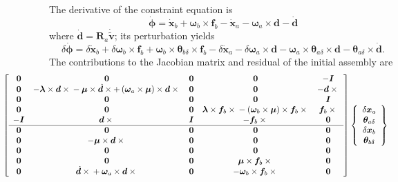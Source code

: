 \documentclass[10pt,fleqn,subeqn]{report}
\newcommand{\T}[1]{\bm{#1}}
\begin{document}
The derivative of the constraint equation is
\begin{equation}
	\dot{\T{\phi}} = 
		\dot{\T{x}}_b
		+ \T{\omega}_b \times \T{f}_b
		- \dot{\T{x}}_a
		- \T{\omega}_a \times \T{d}
		- \dot{\T{d}}
\end{equation}
where $\dot{\T{d}}=\T{R}_a\dot{\tilde{\T{v}}}$; its perturbation yields
\begin{equation}
	\delta\dot{\T{\phi}}
	= \delta\dot{\T{x}}_b
	+ \delta\T{\omega}_b \times \T{f}_b
	+ \T{\omega}_b \times \T{\theta}_{b\delta} \times \T{f}_b
	- \delta\dot{\T{x}}_a
	- \delta\T{\omega}_a \times \T{d}
	- \T{\omega}_a \times \T{\theta}_{a\delta} \times \T{d}
	- \T{\theta}_{a\delta} \times \dot{\T{d}} .
\end{equation}
The contributions to the Jacobian matrix and residual 
of the initial assembly are
\begin{align}
	\small
	& \hspace{-20mm}\sqbr{\matr{ccccc}{
		\T{0} & \T{0} & \T{0} & \T{0} & -\T{I} \\	%
		\T{0} & -\T{\lambda}\times\T{d}\times{}
			- \T{\mu}\times\dot{\T{d}}\times
			+ \plbr{\T{\omega}_a\times\T{\mu}}\times\T{d}\times{} &
			\T{0} & \T{0} & -\T{d}\times{} \\	%
		\T{0} & \T{0} & \T{0} & \T{0} & \T{I} \\	%
		\T{0} & \T{0} & \T{0} & 
			\T{\lambda}\times\T{f}_b\times{}
			- \plbr{\T{\omega}_b\times\T{\mu}}\times\T{f}_b\times{} &
			\T{f}_b\times{} \\	%
		-\T{I} & \T{d}\times{} & \T{I} & -\T{f}_b\times{} &
			\T{0} \\				%
%
	\hline
		\T{0} & \T{0} & \T{0} & \T{0} & \T{0} \\	%
		\T{0} & -\T{\mu}\times\T{d}\times{} &
			\T{0} & \T{0} & \T{0} \\		%
		\T{0} & \T{0} & \T{0} & \T{0} & \T{0} \\	%
		\T{0} & \T{0} & \T{0} &
			\T{\mu}\times\T{f}_b\times{} & \T{0} \\	%
		\T{0} &
			\dot{\T{d}}\times{}
			+ \T{\omega}_a\times\T{d}\times{} &
			\T{0} &
			-\T{\omega}_b\times\T{f}_b\times{} &
			\T{0}					%
	}} \cubr{\cvvect{
		\delta\T{x}_a \\
		\T{\theta}_{a\delta} \\
		\delta\T{x}_b \\
		\T{\theta}_{b\delta} \\
}}
\end{align}
\end{document}
